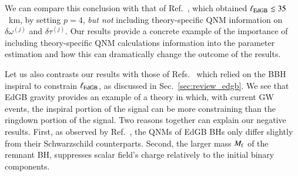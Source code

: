 \documentclass[twocolumn,
               prd,
               aps,
               superscriptaddress,
               tightenlines,
               nofootinbib,
               eqsecnum,
               amsfonts,
               amsmath,
               longbibliography]{revtex4-1}
\begin{document}
We can compare this conclusion with that of Ref.~\cite{Carullo:2021dui}, which obtained $\ell_{\rm EdGB} \lesssim 35$~km,
by setting $p=4$, \emph{but not} including theory-specific QNM information on $\delta \omega^{(j)}$ and $\delta \tau^{(j)}$.
%
Our results provide a concrete example of the importance of including
theory-specific QNM calculations information into the parameter estimation
and how this can dramatically change the outcome of the results.

Let us also contrasts our results with those of Refs.~\cite{Nair:2019iur,Perkins:2021mhb,Lyu:2022gdr}
which relied on the BBH inspiral to constrain $\ell_{\rm EdGB}$, as discussed in Sec.~\ref{sec:review_edgb}.
%
We see that EdGB gravity provides an example of a theory in which, with current GW events, the inspiral portion
of the signal can be more constraining than the ringdown portion of the signal.
%
Two reasons together can explain our negative results. First, as observed by
Ref.~\cite{Blazquez-Salcedo:2016enn}, the QNMs of EdGB BHs only differ slightly
from their Schwarzschild counterparts. Second, the larger mass $M_{\rm f}$ of the
remnant BH, suppresses scalar field's charge relatively to the initial binary
components.
%
\end{document}
